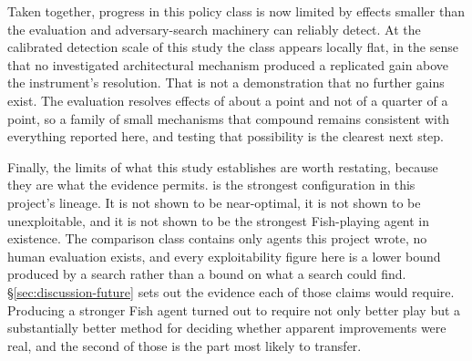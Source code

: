 Taken together, progress in this policy class is now limited by effects smaller than the evaluation
and adversary-search machinery can reliably detect. At the calibrated detection scale of this study
the class appears locally flat, in the sense that no investigated architectural mechanism produced a
replicated gain above the instrument's resolution. That is not a demonstration that no further gains
exist. The evaluation resolves effects of about a point and not of a quarter of a point, so a family
of small mechanisms that compound remains consistent with everything reported here, and testing that
possibility is the clearest next step.

Finally, the limits of what this study establishes are worth restating, because they are what the
evidence permits. \sestina{} is the strongest configuration in this project's lineage. It is not
shown to be near-optimal, it is not shown to be unexploitable, and it is not shown to be the strongest
Fish-playing agent in existence. The comparison class contains only agents this project wrote, no
human evaluation exists, and every exploitability figure here is a lower bound produced by a search
rather than a bound on what a search could find. \S\ref{sec:discussion-future} sets out the evidence
each of those claims would require. Producing a stronger Fish agent turned out to require not only
better play but a substantially better method for deciding whether apparent improvements were real,
and the second of those is the part most likely to transfer.
